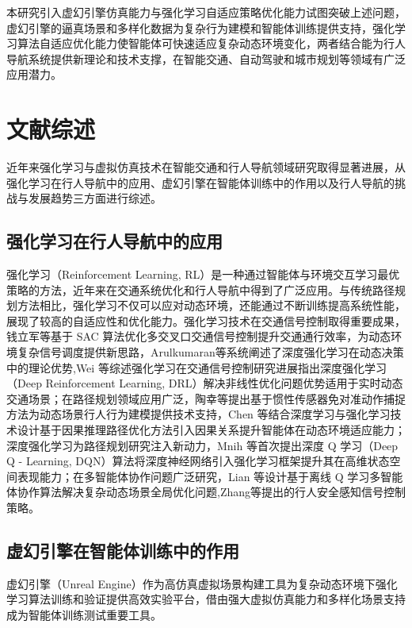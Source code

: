 本研究引入虚幻引擎仿真能力与强化学习自适应策略优化能力试图突破上述问题，虚幻引擎的逼真场景和多样化数据为复杂行为建模和智能体训练提供支持，强化学习算法自适应优化能力使智能体可快速适应复杂动态环境变化，两者结合能为行人导航系统提供新理论和技术支撑，在智能交通、自动驾驶和城市规划等领域有广泛应用潜力。

\section{文献综述}

近年来强化学习与虚拟仿真技术在智能交通和行人导航领域研究取得显著进展，从强化学习在行人导航中的应用、虚幻引擎在智能体训练中的作用以及行人导航的挑战与发展趋势三方面进行综述。

\subsection{强化学习在行人导航中的应用}

强化学习（Reinforcement Learning, RL）是一种通过智能体与环境交互学习最优策略的方法，近年来在交通系统优化和行人导航中得到了广泛应用。与传统路径规划方法相比，强化学习不仅可以应对动态环境，还能通过不断训练提高系统性能，展现了较高的自适应性和优化能力。强化学习技术在交通信号控制取得重要成果，钱立军等\cite{qian2024sac}基于 SAC 算法优化多交叉口交通信号控制提升交通通行效率，为动态环境复杂信号调度提供新思路，Arulkumaran等\cite{arulkumaran2017deeprl}系统阐述了深度强化学习在动态决策中的理论优势,Wei 等\cite{wei2021survey}综述强化学习在交通信号控制研究进展指出深度强化学习（Deep Reinforcement Learning, DRL）解决非线性优化问题优势适用于实时动态交通场景；在路径规划领域应用广泛，陶幸等\cite{tao2024motion}提出基于惯性传感器免对准动作捕捉方法为动态场景行人行为建模提供技术支持，Chen 等\cite{chen2018ionet}结合深度学习与强化学习技术设计基于因果推理路径优化方法引入因果关系提升智能体在动态环境适应能力；深度强化学习为路径规划研究注入新动力，Mnih 等\cite{mnih2013dqn}首次提出深度 Q 学习（Deep Q - Learning, DQN）算法将深度神经网络引入强化学习框架提升其在高维状态空间表现能力；在多智能体协作问题广泛研究，Lian 等\cite{lian2023inverseql}设计基于离线 Q 学习多智能体协作算法解决复杂动态场景全局优化问题,Zhang等\cite{zhang2019pedestrian}提出的行人安全感知信号控制策略。

\subsection{虚幻引擎在智能体训练中的作用}

虚幻引擎（Unreal Engine）作为高仿真虚拟场景构建工具为复杂动态环境下强化学习算法训练和验证提供高效实验平台，借由强大虚拟仿真能力和多样化场景支持成为智能体训练测试重要工具。

